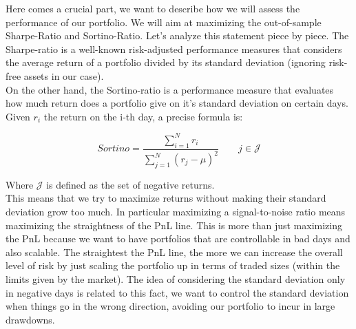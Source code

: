 Here comes a crucial part, we want to describe how we will assess the performance of our portfolio. We will aim at maximizing the out-of-sample Sharpe-Ratio and Sortino-Ratio. Let's analyze this statement piece by piece. The Sharpe-ratio is a well-known risk-adjusted performance measures that considers the average return of a portfolio divided by its standard deviation (ignoring risk-free assets in our case).\\
On the other hand, the Sortino-ratio is a performance measure that evaluates how much return does a portfolio give on it's standard deviation on certain days. Given $r_i$ the return on the i-th day, a precise formula is:

$$
Sortino = \displaystyle \frac{\sum\limits_{i=1}^N r_i}{\sum\limits_{j=1}^N (r_j - \mu)^2} \qquad j \in \mathcal{J}
$$ 

Where $\mathcal{J}$ is defined as the set of negative returns.\\
This means that we try to maximize returns without making their standard deviation grow too much. In particular maximizing a signal-to-noise ratio means maximizing the straightness of the PnL line. This is more than just maximizing the PnL because we want to have portfolios that are controllable in bad days and also scalable. The straightest the PnL line, the more we can increase the overall level of risk by just scaling the portfolio up in terms of traded sizes (within the limits given by the market). The idea of considering the standard deviation only in negative days is related to this fact, we want to control the standard deviation when things go in the wrong direction, avoiding our portfolio to incur in large drawdowns.